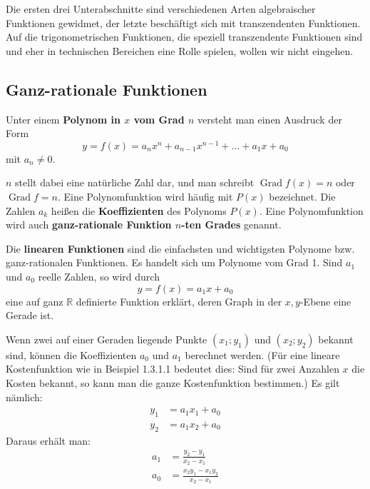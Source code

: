 Die ersten drei Unterabschnitte sind verschiedenen Arten algebraischer Funktionen gewidmet, der letzte beschäftigt sich mit transzendenten Funktionen. Auf die trigonometrischen Funktionen, die speziell transzendente Funktionen sind und eher in technischen Bereichen eine Rolle spielen, wollen wir nicht eingehen.

\subsection{Ganz-rationale Funktionen}

Unter einem \textbf{Polynom in $x$ vom Grad $n$} versteht man einen Ausdruck der Form
\[ y = f(x) = a_n x^n + a_{n-1} x^{n-1} + \ldots + a_1 x + a_0 \]
mit $a_n \neq 0$.

$n$ stellt dabei eine natürliche Zahl dar, und man schreibt $\operatorname{Grad} f(x) = n$ oder $\operatorname{Grad} f = n$. Eine Polynomfunktion wird häufig mit $P(x)$ bezeichnet. Die Zahlen $a_k$ heißen die \textbf{Koeffizienten} des Polynoms $P(x)$. Eine Polynomfunktion wird auch \textbf{ganz-rationale Funktion $n$-ten Grades} genannt.

Die \textbf{linearen Funktionen} sind die einfachsten und wichtigsten Polynome bzw. ganz-rationalen Funktionen. Es handelt sich um Polynome vom Grad 1. Sind $a_1$ und $a_0$ reelle Zahlen, so wird durch
\[ y = f(x) = a_1 x + a_0 \]
eine auf ganz $\mathbb{R}$ definierte Funktion erklärt, deren Graph in der $x,y$-Ebene eine Gerade ist.

Wenn zwei auf einer Geraden liegende Punkte $(x_1;y_1)$ und $(x_2;y_2)$ bekannt sind, können die Koeffizienten $a_0$ und $a_1$ berechnet werden. (Für eine lineare Kostenfunktion wie in Beispiel 1.3.1.1 bedeutet dies: Sind für zwei Anzahlen $x$ die Kosten bekannt, so kann man die ganze Kostenfunktion bestimmen.) Es gilt nämlich:
\begin{align*}
  y_1 &= a_1 x_1 + a_0\\
  y_2 &= a_1 x_2 + a_0
\end{align*}
Daraus erhält man:
\begin{align*}
  a_1 &= \frac{y_2 - y_1}{x_2 - x_1}\\
  a_0 &= \frac{x_2 y_1 - x_1 y_2}{x_2 - x_1}
\end{align*}

\begin{center}
\end{center}

